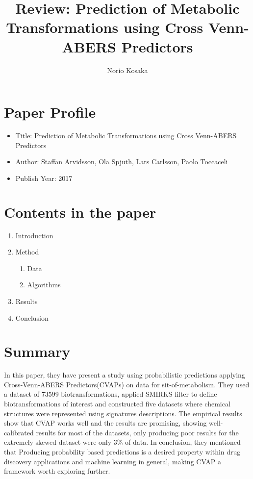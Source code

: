 \documentclass[10pt,a4paper]{article}
\author{Norio Kosaka}
\title{Review: Prediction of Metabolic Transformations using Cross Venn-ABERS Predictors}
\begin{document}
\maketitle

\section{Paper Profile}
\begin{itemize}
\item Title: Prediction of Metabolic Transformations using Cross Venn-ABERS Predictors
\item Author: Staffan Arvidsson, Ola Spjuth, Lars Carlsson, Paolo Toccaceli
\item Publish Year: 2017
\end{itemize}

\section{Contents in the paper}
\begin{enumerate}
\item Introduction
\item Method
\begin{enumerate}
    \item Data
    \item Algorithms
\end{enumerate}
\item Results
\item Conclusion
\end{enumerate}

\section{Summary}
In this paper, they have present a study using probabilistic predictions applying Cross-Venn-ABERS Predictors(CVAPs) on data for sit-of-metabolism. They used a dataset of 73599 biotransformations, applied SMIRKS filter to define biotransformations of interest and constructed five datasets where chemical structures were represented using signatures descriptions. The empirical results show that CVAP works well and the results are promising, showing well-calibrated results for most of the datasets, only producing poor results for the extremely skewed dataset were only 3\% of data. In conclusion, they mentioned that Producing probability based predictions is a desired property within drug discovery applications and machine learning in general, making CVAP a framework worth exploring further.

\medskip
 
\printbibliography
\end{document}
